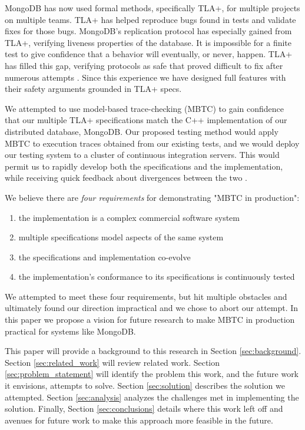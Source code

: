 \documentclass{vldb}
\begin{document}
MongoDB has now used formal methods, specifically TLA+, for multiple projects on multiple teams. 
TLA+ has helped reproduce bugs found in tests and validate fixes for those bugs. 
MongoDB's replication protocol has especially gained from TLA+, verifying liveness properties of the database. 
It is impossible for a finite test to give confidence that a behavior will eventually, or never, happen. TLA+ has filled this gap, verifying protocols as safe that proved difficult to fix after numerous attempts \cite{Schultz19BugsLife}. 
Since this experience we have designed full features with their safety arguments grounded in TLA+ specs. 

We attempted to use model-based trace-checking (MBTC) \cite{MBTC} to gain confidence that our multiple TLA+ specifications match the C++ implementation of our distributed database, MongoDB.
Our proposed testing method would apply MBTC to execution traces obtained from our existing tests, and we would deploy our testing system to a cluster of continuous integration servers.
This would permit us to rapidly develop both the specifications and the implementation, while receiving quick feedback about divergences between the two \cite{Gravell11ConcurrentDevelopmentOfModelAndImplementation}.

We believe there are \textit{four requirements} for demonstrating "MBTC in production":
\begin{enumerate}
\item the implementation is a complex commercial software system
\item multiple specifications model aspects of the same system
\item the specifications and implementation co-evolve
\item the implementation's conformance to its specifications is continuously tested
\end{enumerate}


We attempted to meet these four requirements, but hit multiple obstacles and ultimately found our direction impractical and we chose to abort our attempt.
In this paper we propose a vision for future research to make MBTC in production practical for systems like MongoDB.

This paper will provide a background to this research in Section \ref{sec:background}. Section \ref{sec:related_work} will review related work. Section \ref{sec:problem_statement} will identify the problem this work, and the future work it envisions, attempts to solve. Section \ref{sec:solution} describes the solution we attempted. Section \ref{sec:analysis} analyzes the challenges met in implementing the solution. Finally, Section \ref{sec:conclusions} details where this work left off and avenues for future work to make this approach more feasible in the future.
\end{document}
